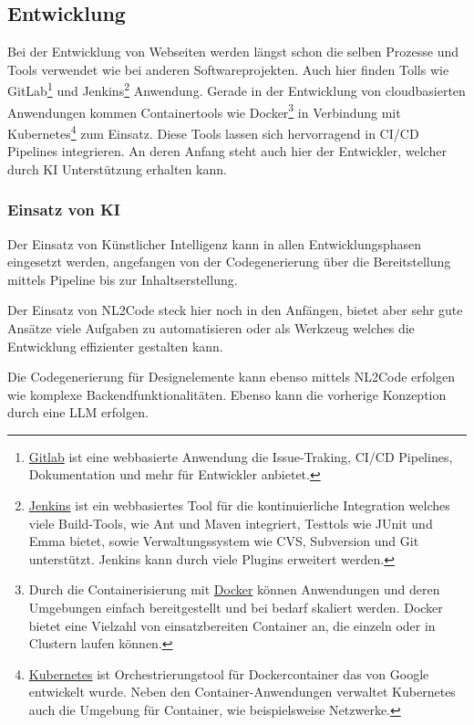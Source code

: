 \subsection{Entwicklung}
Bei der Entwicklung von Webseiten werden längst schon die selben Prozesse und Tools verwendet wie bei anderen Softwareprojekten. Auch hier finden Tolls wie GitLab\footnote{\href{https://about.gitlab.com/}{Gitlab} ist eine webbasierte Anwendung die Issue-Traking, CI/CD Pipelines, Dokumentation und mehr für Entwickler anbietet.} und Jenkins\footnote{\href{https://www.jenkins.io/}{Jenkins} ist ein webbasiertes Tool für die kontinuierliche Integration welches viele Build-Tools, wie Ant und Maven integriert, Testtols wie JUnit und Emma bietet, sowie Verwaltungssystem wie CVS, Subversion und Git unterstützt. Jenkins kann durch viele Plugins erweitert werden.} Anwendung. Gerade in der Entwicklung von cloudbasierten Anwendungen kommen Containertools wie Docker\footnote{Durch die Containerisierung mit \href{https://www.docker.com/}{Docker} können Anwendungen und deren Umgebungen einfach bereitgestellt und bei bedarf skaliert werden. Docker bietet eine Vielzahl von einsatzbereiten Container an, die einzeln oder in Clustern laufen können.} in Verbindung mit Kubernetes\footnote{\href{https://kubernetes.io/}{Kubernetes} ist  Orchestrierungstool für Dockercontainer das von Google entwickelt wurde. Neben den Container-Anwendungen verwaltet Kubernetes auch die Umgebung für Container, wie beispielsweise Netzwerke.} zum Einsatz. Diese Tools lassen sich hervorragend in CI/CD Pipelines integrieren. An deren Anfang steht auch hier der Entwickler, welcher durch KI Unterstützung erhalten kann.


\subsubsection{Einsatz von KI}
Der Einsatz von Künstlicher Intelligenz kann in allen Entwicklungsphasen eingesetzt werden, angefangen von der Codegenerierung über die Bereitstellung mittels Pipeline bis zur Inhaltserstellung.\vspace{0.2cm}

Der Einsatz von NL2Code steck hier noch in den Anfängen, bietet aber sehr gute Ansätze viele Aufgaben zu automatisieren oder als Werkzeug welches die Entwicklung effizienter gestalten kann.\vspace{0.2cm}

Die Codegenerierung für Designelemente kann ebenso mittels NL2Code erfolgen wie komplexe Backendfunktionalitäten. Ebenso kann die vorherige Konzeption durch eine LLM erfolgen.

